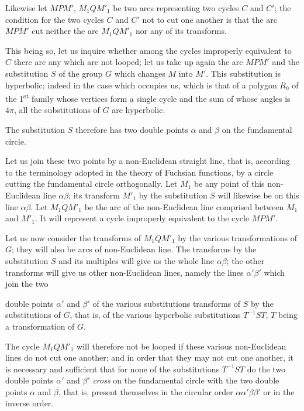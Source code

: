 \documentclass{article}
\begin{document}
Likewise let $MPM'$, $M_{1}QM'_{1}$ be two arcs representing two cycles $C$ and $C'$; the condition for the two cycles $C$ and $C'$ not to cut one another is that the arc $MPM'$ cut neither the arc $M_{1}QM'_{1}$ nor any of its transforms.

This being so, let us inquire whether among the cycles improperly equivalent to $C$ there are any which are not looped; let us take up again the arc $MPM'$ and the substitution $S$ of the group $G$ which changes $M$ into $M'$. This substitution is hyperbolic; indeed in the case which occupies us, which is that of a polygon $R_{0}$ of the 1\textsuperscript{st} family whose vertices form a single cycle and the sum of whose angles is $4\pi$, all the substitutions of $G$ are hyperbolic.

The substitution $S$ therefore has two double points $\alpha$ and $\beta$ on the fundamental circle.

Let us join these two points by a non-Euclidean straight line, that is, according to the terminology adopted in the theory of Fuchsian functions, by a circle cutting the fundamental circle orthogonally. Let $M_{1}$ be any point of this non-Euclidean line $\alpha\beta$; its transform $M'_{1}$ by the substitution $S$ will likewise be on this line $\alpha\beta$. Let $M_{1}QM'_{1}$ be the arc of the non-Euclidean line comprised between $M_{1}$ and $M'_{1}$. It will represent a cycle improperly equivalent to the cycle $MPM'$.

Let us now consider the transforms of $M_{1}QM'_{1}$ by the various transformations of $G$; they will also be arcs of non-Euclidean line. The transforms by the substitution $S$ and its multiples will give us the whole line $\alpha\beta$; the other transforms will give us other non-Euclidean lines, namely the lines $\alpha'\beta'$ which join the two

double points $\alpha'$ and $\beta'$ of the various substitutions transforms of $S$ by the substitutions of $G$, that is, of the various hyperbolic substitutions $T^{-1}ST$, $T$ being a transformation of $G$.

The cycle $M_{1}QM'_{1}$ will therefore not be looped if these various non-Euclidean lines do not cut one another; and in order that they may not cut one another, it is necessary and sufficient that for none of the substitutions $T^{-1}ST$ do the two double points $\alpha'$ and $\beta'$ \emph{cross} on the fundamental circle with the two double points $\alpha$ and $\beta$, that is, present themselves in the circular order $\alpha\alpha'\beta\beta'$ or in the inverse order.
\end{document}
